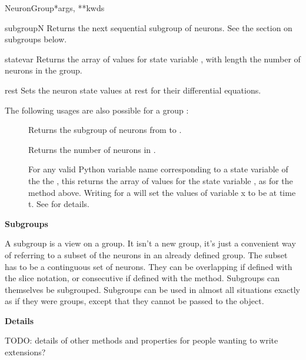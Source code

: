 \documentclass[letterpaper,10pt,english]{manual}
\begin{document}
\begin{classdesc}{NeuronGroup}{*args, **kwds}
\hypertarget{brian.NeuronGroup.subgroup}{}\begin{methoddesc}{subgroup}{N}
Returns the next sequential subgroup of  neurons. See
the section on subgroups below.
\end{methoddesc}

\hypertarget{brian.NeuronGroup.state}{}\begin{methoddesc}{state}{var}
Returns the array of values for state
variable , with length the number of neurons in the
group.
\end{methoddesc}

\hypertarget{brian.NeuronGroup.rest}{}\begin{methoddesc}{rest}{}
Sets the neuron state values at rest for their differential
equations.
\end{methoddesc}

The following usages are also possible for a group :
\begin{description}
\item[] \leavevmode
Returns the subgroup of neurons from  to .

\item[] \leavevmode
Returns the number of neurons in .

\item[] \leavevmode
For any valid Python variable name  corresponding to
a state variable of the the \hyperlink{brian.NeuronGroup}{}, this
returns the array of values for the state
variable , as for the \hyperlink{brian.NeuronGroup.state}{} method
above. Writing  for  a \hyperlink{brian.TimedArray}{}
will set the values of variable x to be  at time t.
See \hyperlink{brian.TimedArraySetter}{} for details.

\end{description}

\textbf{Subgroups}

A subgroup is a view on a group. It isn't a new group, it's just
a convenient way of referring to a subset of the neurons in an
already defined group. The subset has to be a continguous set of
neurons. They can be overlapping if defined with the slice
notation, or consecutive if defined with the \hyperlink{brian.NeuronGroup.subgroup}{} method.
Subgroups can themselves be subgrouped. Subgroups can be used in
almost all situations exactly as if they were groups, except that
they cannot be passed to the \hyperlink{brian.Network}{} object.

\textbf{Details}

TODO: details of other methods and properties for people
wanting to write extensions?
\end{classdesc}
\end{document}
